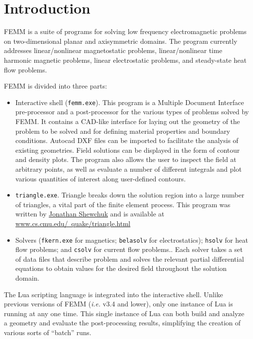 \documentclass[12pt]{report}
\begin{document}
\chapter{Introduction}

FEMM is a suite of programs for solving low frequency
electromagnetic problems on two-dimensional planar and axisymmetric
domains.  The program currently addresses linear/nonlinear
magnetostatic problems, linear/nonlinear time harmonic magnetic
problems, linear electrostatic problems, and steady-state heat
flow problems.

FEMM is divided into three parts:

\begin{itemize}
\item Interactive shell ({\tt femm.exe}).  This program is a Multiple
Document Interface pre-processor and a post-processor for the
various types of problems solved by FEMM. It contains a CAD-like
interface for laying out the geometry of the problem to be solved
and for defining material properties and boundary conditions.
Autocad DXF files can be imported to facilitate the analysis of
existing geometries. Field solutions can be displayed in the form
of contour and density plots.  The program also allows the user to
inspect the field at arbitrary points, as well as evaluate a number
of different integrals and plot various quantities of interest
along user-defined contours.

\item {\tt triangle.exe}.  Triangle breaks down the solution
region into a large number of triangles, a vital part of the finite
element process.  This program was written by
\href{http://www.cs.cmu.edu/~quake/triangle.html}{Jonathan Shewchuk}
and is available at \href{http://www.cs.cmu.edu/~quake/triangle.html}{www.cs.cmu.edu/~quake/triangle.html}
\item Solvers ({\tt fkern.exe} for magnetics; {\tt belasolv} for
electrostatics); {\tt hsolv} for heat flow problems; and
{\tt csolv} for current flow problems.. Each
solver takes a set of data files that describe problem and solves
the relevant partial differential equations to obtain values for
the desired field throughout the solution domain.
\end{itemize}

The Lua scripting language is integrated into the interactive
shell. Unlike previous versions of FEMM ({\em i.e.} v3.4 and
lower), only one instance of Lua is running at any one time. This
single instance of Lua can both build and analyze a geometry and
evaluate the post-processing results, simplifying the creation of
various sorts of ``batch'' runs.
\end{document}
